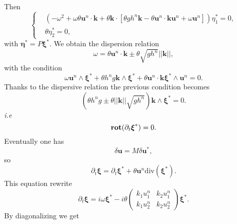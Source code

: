 \documentclass[a4paper, 11pt]{report}
\begin{document}
Then
\begin{equation*}
\left\{
\begin{split}
&\left(-\omega^2+\omega \theta\boldsymbol{u}^n\cdot \boldsymbol{k}+\theta\boldsymbol{k}\cdot \left[\theta gh^n\boldsymbol{k}-\theta \boldsymbol{u}^n\cdot \boldsymbol{k}\boldsymbol{u}^n+\omega \boldsymbol{u}^n
\right]\right)\eta_1^*=0,\\
&\theta \eta_2^*=0,
\end{split}\right.
\end{equation*}
with $\boldsymbol{\eta}^*=P\boldsymbol{\xi}^*$.
We obtain the dispersion relation
\begin{equation*}
\omega=\theta\boldsymbol{u}^n\cdot \boldsymbol{k}\pm\theta\sqrt{gh^n}||\boldsymbol{k}||,
\end{equation*} 
with the condition
\begin{equation*}
\omega \boldsymbol{u}^n\wedge \boldsymbol{\xi}^*+\theta h^ng\boldsymbol{k}\wedge \boldsymbol{\xi}^*+\theta\boldsymbol{u}^n\cdot \boldsymbol{k}\boldsymbol{\xi}^*\wedge \boldsymbol{u}^n=0.
\end{equation*}
Thanks to the dispersive relation the previous condition becomes
\begin{equation*}
\left(\theta h^ng\pm \theta||\boldsymbol{k}||\sqrt{gh^n}\right)\boldsymbol{k}\wedge \boldsymbol{\xi}^*=0.
\end{equation*}
\textit{i.e}
\begin{equation*}
\text{\textbf{rot}}(\partial_t\boldsymbol{\xi}^*)=0.
\end{equation*}
Eventually one has
\begin{equation*}
\delta \boldsymbol{u}=M\delta \boldsymbol{u}^*,
\end{equation*}
so \begin{equation*}
\partial_t \boldsymbol{\xi}=\partial_t\boldsymbol{\xi}^*+\theta\boldsymbol{u}^n\text{div}(\boldsymbol{\xi}^*). 
\end{equation*}
This equation rewrite
\begin{equation*}
\partial_t \boldsymbol{\xi}=i\omega\boldsymbol{\xi}^*-i\theta\begin{pmatrix}k_1u_1^n&k_2u_1^n\\k_1u_2^n&k_2u_2^n\end{pmatrix}\boldsymbol{\xi}^*.
\end{equation*}
By diagonalizing we get
\end{document}
